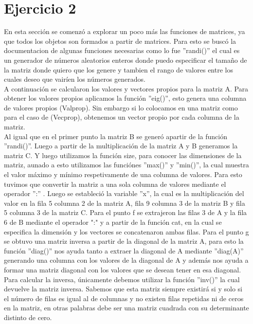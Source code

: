 \documentclass[12pt,letterpaper]{article}
\begin{document}
\section{Ejercicio 2}
En esta sección se comenzó a explorar un poco más las funciones de matrices, ya que todos los objetos son formados a partir de matrices. Para esto se buscó la documentacion de algunas funciones necesarias como lo fue ''randi()'' el cual es un generador de números aleatorios enteros donde puedo especificar el tamaño de la matriz donde quiero que los genere y tambien el rango de valores entre los cuales deseo que vairíen los números generados.\\
A continuación se calcularon los valores y vectores propios para la matriz A. Para obtener los valores propios aplicamos la función ''eig()'', esto genera una columna de valores propios (Valprop). Sin embargo si lo colocamos en una matriz como para el caso de (Vecprop), obtenemos un vector propio por cada columna de la matriz.\\
Al igual que en el primer punto la matriz B se generó apartir de la función ''randi()''.
Luego a partir de la multiplicación de la matriz A y B generamos la matriz C. Y luego utilizamos la función size, para conocer las dimensiones de la matriz, aunado a esto utilizamos las funciónes ''max()'' y ''min()'', la cual muestra el valor máximo y mínimo respetivamente de una columna  de valores. Para esto tuvimos que convertir la matriz a una sola columna de valores mediante el operador '':'' . 
Luego se estableció la variable ''x'', la cual es la multiplicación del valor en la fila 5 columna 2 de la matriz A, fila 9 columna 3 de la matriz B y fila 5 columna 3 de la matriz C.
Para el punto f se extrajeron las filas 3 de A y la fila 6 de B mediante el operador ":"  y a partir de la función cat, en la cual se especifica la dimensión y los vectores se concatenaron ambas filas.
Para el punto g se obtuvo una matriz inversa a partir de la diagonal de la matriz A, para esto la función ''diag()'' nos ayuda tanto a extraer la diagonal de A mediante ''diag(A)'' generando una columna con los valores de la diagonal de A y además nos ayuda a formar una matriz diagonal con los valores que se desean tener en esa diagonal. Para calcular la inversa, únicamente debemos utilizar la función ''inv()'' la cual devuelve la matriz inversa. Sabemos que esta matriz siempre existirá si y solo si el número de filas es igual al de columnas y no existen filas repetidas ni de ceros en la matriz, en otras palabras debe ser una matriz cuadrada con su determinante distinto de cero. \\
\end{document}
